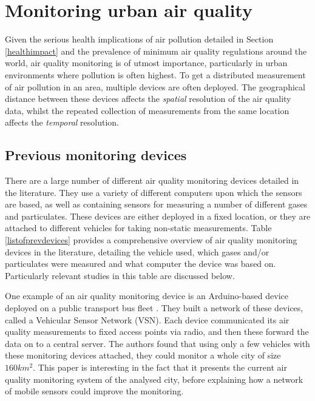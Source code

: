 \documentclass[11pt,twosided,a4paper]{report}
\begin{document}

    
\section{Monitoring urban air quality}

Given the serious health implications of air pollution detailed in Section \ref{healthimpact} and the prevalence of minimum air quality regulations around the world, air quality monitoring is of utmost importance, particularly in urban environments where pollution is often highest. To get a distributed measurement of air pollution in an area, multiple devices are often deployed. The geographical distance between these devices affects the \textit{spatial} resolution of the air quality data, whilst the repeated collection of measurements from the same location affects the \textit{temporal} resolution.

\subsection{Previous monitoring devices}

There are a large number of different air quality monitoring devices detailed in the literature. They use a variety of different computers upon which the sensors are based, as well as containing sensors for measuring a number of different gases and particulates. These devices are either deployed in a fixed location, or they are attached to different vehicles for taking non-static measurements. Table \ref{listofprevdevices} provides a comprehensive overview of air quality monitoring devices in the literature, detailing the vehicle used, which gases and/or particulates were measured and what computer the device was based on. Particularly relevant studies in this table are discussed below.

One example of an air quality monitoring device is an Arduino-based device deployed on a public transport bus fleet \citep{2014busairqualityVSN}. They built a network of these devices, called a Vehicular Sensor Network (VSN). Each device communicated its air quality measurements to fixed access points via radio, and then these forward the data on to a central server. The authors found that using only a few vehicles with these monitoring devices attached, they could monitor a whole city of size \(160km^2\). This paper is interesting in the fact that it presents the current air quality monitoring system of the analysed city, before explaining how a network of mobile sensors could improve the monitoring. 
\end{document}
